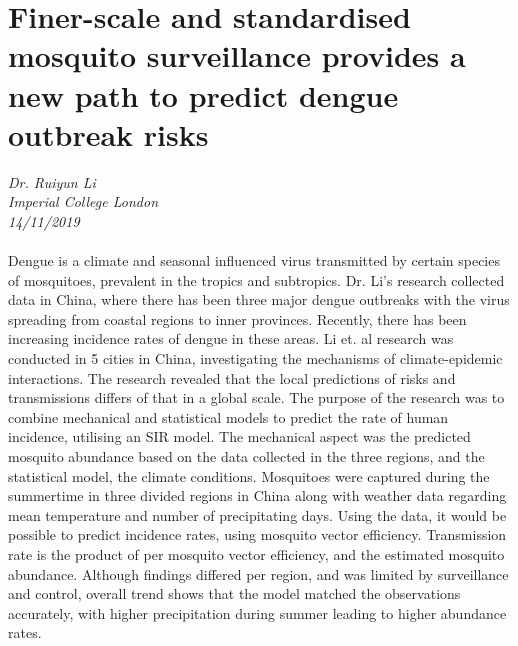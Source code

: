 \documentclass[11pt]{article}
\begin{document}
\section{Finer-scale and standardised mosquito surveillance provides a new path to predict dengue outbreak risks}
\textit{Dr. Ruiyun Li\\Imperial College London\\14/11/2019}
\\
\\Dengue is a climate and seasonal influenced virus transmitted by certain species of mosquitoes, prevalent in the tropics and subtropics. Dr. Li's research collected data in China, where there has been three major dengue outbreaks with the virus spreading from coastal regions to inner provinces. Recently, there has been increasing incidence rates of dengue in these areas. Li et. al research was conducted in 5 cities in China, investigating the mechanisms of climate-epidemic interactions. The research revealed that the local predictions of risks and transmissions differs of that in a global scale. The purpose of the research was to combine mechanical and statistical models to predict the rate of human incidence, utilising an SIR model. The mechanical aspect was the predicted mosquito abundance based on the data collected in the three regions, and the statistical model, the climate conditions. Mosquitoes were captured during the summertime in three divided regions in China along with weather data regarding mean temperature and number of precipitating days. Using the data, it would be possible to predict incidence rates, using mosquito vector efficiency. Transmission rate is the product of per mosquito vector efficiency, and the estimated mosquito abundance. Although findings differed per region, and was limited by surveillance and control, overall trend shows that the model matched the observations accurately, with higher precipitation during summer leading to higher abundance rates.
\end{document}
